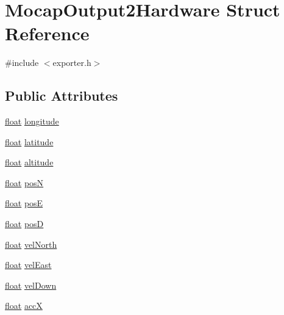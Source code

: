 \hypertarget{struct_mocap_output2_hardware}{\section{Mocap\-Output2\-Hardware Struct Reference}
\label{struct_mocap_output2_hardware}
}


{\ttfamily \#include $<$exporter.\-h$>$}

\subsection*{Public Attributes}
\begin{DoxyCompactItemize}
\item 
\hyperlink{_super_l_u_support_8h_a6a1bb6ed41f44b60e7bd83b0e9945aa7}{float} \hyperlink{group___mo_cap_plugin_ga65a9de4b87de2a4aaff0760f2b912407}{longitude}
\item 
\hyperlink{_super_l_u_support_8h_a6a1bb6ed41f44b60e7bd83b0e9945aa7}{float} \hyperlink{group___mo_cap_plugin_gacfbf5cf513abfc200b4fd5c14dad294c}{latitude}
\item 
\hyperlink{_super_l_u_support_8h_a6a1bb6ed41f44b60e7bd83b0e9945aa7}{float} \hyperlink{group___mo_cap_plugin_ga6f5725506a151cfd49e1c6b80c2e948f}{altitude}
\item 
\hyperlink{_super_l_u_support_8h_a6a1bb6ed41f44b60e7bd83b0e9945aa7}{float} \hyperlink{group___mo_cap_plugin_ga75792a6a49b67e8d7b63a219ca0f2ed2}{pos\-N}
\item 
\hyperlink{_super_l_u_support_8h_a6a1bb6ed41f44b60e7bd83b0e9945aa7}{float} \hyperlink{group___mo_cap_plugin_gaeb486e47d519b624cd7b598eb6f33169}{pos\-E}
\item 
\hyperlink{_super_l_u_support_8h_a6a1bb6ed41f44b60e7bd83b0e9945aa7}{float} \hyperlink{group___mo_cap_plugin_ga60ef031584e000727250ea18e4e0ce36}{pos\-D}
\item 
\hyperlink{_super_l_u_support_8h_a6a1bb6ed41f44b60e7bd83b0e9945aa7}{float} \hyperlink{group___mo_cap_plugin_gadfa715081f6bc74af7efc32c39d720f2}{vel\-North}
\item 
\hyperlink{_super_l_u_support_8h_a6a1bb6ed41f44b60e7bd83b0e9945aa7}{float} \hyperlink{group___mo_cap_plugin_gaa2d1409fe871a4dd45265e2412d53f67}{vel\-East}
\item 
\hyperlink{_super_l_u_support_8h_a6a1bb6ed41f44b60e7bd83b0e9945aa7}{float} \hyperlink{group___mo_cap_plugin_ga2ffad0e2c72a914bb6f9ff031aeb9b79}{vel\-Down}
\item 
\hyperlink{_super_l_u_support_8h_a6a1bb6ed41f44b60e7bd83b0e9945aa7}{float} \hyperlink{group___mo_cap_plugin_ga34811521a55099df3d905b19ab544638}{acc\-X}

\end{DoxyCompactItemize}
